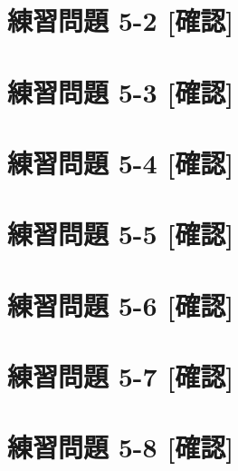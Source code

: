 \documentclass[
]{book}
\begin{document}
\hypertarget{ux7df4ux7fd2ux554fux984c-5-2-ux78baux8a8d}{%
\section*{練習問題 5-2 {[}確認{]}}\label{ux7df4ux7fd2ux554fux984c-5-2-ux78baux8a8d}}

\hypertarget{ux7df4ux7fd2ux554fux984c-5-3-ux78baux8a8d}{%
\section*{練習問題 5-3 {[}確認{]}}\label{ux7df4ux7fd2ux554fux984c-5-3-ux78baux8a8d}}

\hypertarget{ux7df4ux7fd2ux554fux984c-5-4-ux78baux8a8d}{%
\section*{練習問題 5-4 {[}確認{]}}\label{ux7df4ux7fd2ux554fux984c-5-4-ux78baux8a8d}}

\hypertarget{ux7df4ux7fd2ux554fux984c-5-5-ux78baux8a8d}{%
\section*{練習問題 5-5 {[}確認{]}}\label{ux7df4ux7fd2ux554fux984c-5-5-ux78baux8a8d}}

\hypertarget{ux7df4ux7fd2ux554fux984c-5-6-ux78baux8a8d}{%
\section*{練習問題 5-6 {[}確認{]}}\label{ux7df4ux7fd2ux554fux984c-5-6-ux78baux8a8d}}

\hypertarget{ux7df4ux7fd2ux554fux984c-5-7-ux78baux8a8d}{%
\section*{練習問題 5-7 {[}確認{]}}\label{ux7df4ux7fd2ux554fux984c-5-7-ux78baux8a8d}}

\hypertarget{ux7df4ux7fd2ux554fux984c-5-8-ux78baux8a8d}{%
\section*{練習問題 5-8 {[}確認{]}}\label{ux7df4ux7fd2ux554fux984c-5-8-ux78baux8a8d}}
\end{document}
